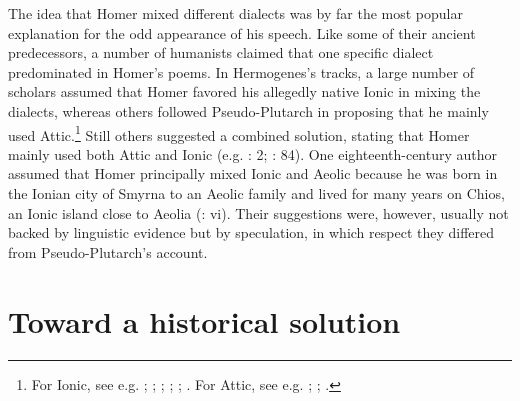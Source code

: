 The idea that Homer mixed different dialects was by far the most popular explanation for the odd appearance of his speech. Like some of their ancient predecessors, a number of humanists claimed that one specific dialect predominated in Homer’s poems. In Hermogenes’s tracks, a large number of scholars assumed that Homer favored his allegedly native Ionic in mixing the dialects, whereas others followed Pseudo-Plutarch in proposing that he mainly used Attic.\footnote{For Ionic, see e.g. ; \citet[215]{Ringelbergh1541}; \citet[167]{Labbe1639}; \citet[\textsc{b.3}\textsc{\textsuperscript{v}}]{KirchmaierCrusius1684}; \citet[b.2\textsc{\textsuperscript{r}}, 334]{Nibbe1725}; \citet[161]{Gesner1774}. For Attic, see e.g. \citet[\textsc{f.}v\textsc{\textsuperscript{r}}]{Codro1502}; \citet[96\textsc{\textsuperscript{r}}]{Waser1610}; \citet[514]{Fabricius1711}.} Still others suggested a combined solution, stating that Homer mainly used both Attic and Ionic (e.g. \citealt{Schmidt1604}: 2; \citealt{Rhenius1626}: 84). One eighteenth-century author assumed that Homer principally mixed Ionic and Aeolic because he was born in the Ionian city of Smyrna to an Aeolic family and lived for many years on Chios, an Ionic island close to Aeolia (\citealt{Reynolds1752}: vi). Their suggestions were, however, usually not backed by linguistic evidence but by speculation, in which respect they differed from Pseudo-Plutarch’s account.

\section{Toward a historical solution}\label{sec:4.3}


